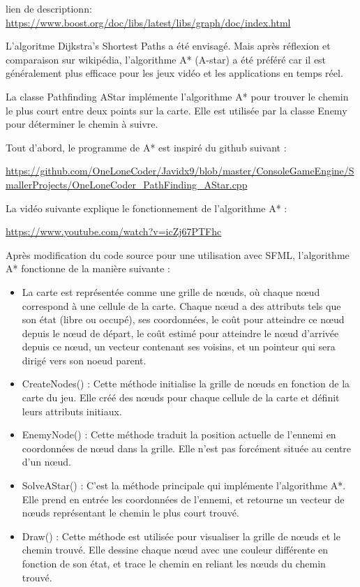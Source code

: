 lien de descriptionn: \url{https://www.boost.org/doc/libs/latest/libs/graph/doc/index.html}

L'algoritme Dijkstra's Shortest Paths a été envisagé. Mais après réflexion et comparaison sur wikipédia, l'algorithme A* (A-star) a été préféré car il est généralement plus efficace pour les jeux vidéo et les applications en temps réel.


La classe Pathfinding AStar implémente l'algorithme A* pour trouver le chemin le plus court entre deux points sur la carte.
Elle est utilisée par la classe Enemy pour déterminer le chemin à suivre.


Tout d'abord, le programme de A* est inspiré du github suivant : 


\url{https://github.com/OneLoneCoder/Javidx9/blob/master/ConsoleGameEngine/SmallerProjects/OneLoneCoder_PathFinding_AStar.cpp}


La vidéo suivante explique le fonctionnement de l'algorithme A* : 


\url{https://www.youtube.com/watch?v=icZj67PTFhc} 


Après modification du code source pour une utilisation avec SFML, l'algorithme A* fonctionne de la manière suivante :
\begin{itemize}


    \item La carte est représentée comme une grille de nœuds, où chaque nœud correspond à une cellule de la carte. 
    Chaque nœud a des attributs tels que son état (libre ou occupé), ses coordonnées, 
    le coût pour atteindre ce nœud depuis le nœud de départ, le coût estimé pour atteindre le nœud d'arrivée depuis ce nœud, 
    un vecteur contenant ses voisins, et un pointeur qui sera dirigé vers son noeud parent.


    \item CreateNodes() : Cette méthode initialise la grille de nœuds en fonction de la carte du jeu. 
    Elle créé des nœuds pour chaque cellule de la carte et définit leurs attributs initiaux.
    

    \item EnemyNode() : Cette méthode traduit la position actuelle de l'ennemi en coordonnées de nœud dans la grille.
    Elle n'est pas forcément située au centre d'un nœud.


    \item SolveAStar() : C'est la méthode principale qui implémente l'algorithme A*. Elle prend en entrée les coordonnées de l'ennemi,
    et retourne un vecteur de nœuds représentant le chemin le plus court trouvé.
    

    \item Draw() : Cette méthode est utilisée pour visualiser la grille de nœuds et le chemin trouvé.
    Elle dessine chaque nœud avec une couleur différente en fonction de son état, et trace le chemin en reliant les nœuds du chemin trouvé.


\end{itemize}

